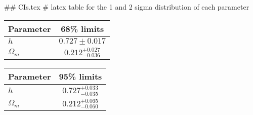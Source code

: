 ## CIs.tex
# latex table for the 1 and 2 sigma distribution of each parameter

\begin{tabular} { l  c}
 Parameter &  68\% limits\\
\hline
{\boldmath$h              $} & $0.727\pm 0.017            $\\
{\boldmath$\Omega_m       $} & $0.212^{+0.027}_{-0.036}   $\\
\hline
\end{tabular}

\begin{tabular} { l  c}
 Parameter &  95\% limits\\
\hline
{\boldmath$h              $} & $0.727^{+0.033}_{-0.035}   $\\
{\boldmath$\Omega_m       $} & $0.212^{+0.065}_{-0.060}   $\\
\hline
\end{tabular}
